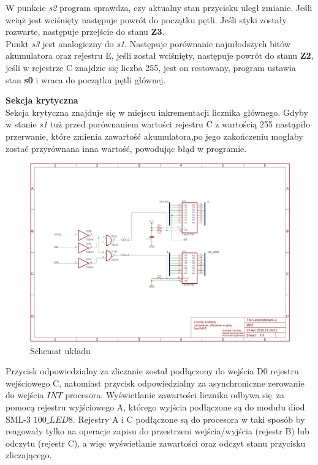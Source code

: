 \documentclass[fleqn]{article}
\begin{document}
W punkcie \textit{s2} program sprawdza, czy aktualny stan przycisku uległ zmianie. Jeśli wciąż jest wciśnięty następuje powrót do początku pętli. Jeśli styki zostały rozwarte, następuje przejście do stanu \textbf{Z3}.\\
Punkt \textit{s3} jest analogiczny do \textit{s1}. Następuje porównanie najmłodszych bitów akumulatora oraz rejestru E, jeśli został wciśnięty, następuje powrót do stanu \textbf{Z2}, jeśli w rejestrze C znajdzie się liczba 255, jest on restowany, program ustawia stan \textbf{s0} i wraca do początku pętli głównej.

\textbf{Sekcja krytyczna}
\\
Sekcja krytyczna znajduje się w miejscu inkrementacji licznika głównego. Gdyby w stanie \textit{s1} tuż przed porównaniem wartości rejestru C z wartością 255 nastąpiło przerwanie, które zmienia zawartość akumulatora,po jego zakończeniu mogłaby zostać przyrównana inna wartość, powodując błąd w programie. 
\begin{figure}[H]
	\centering
	\includegraphics[width=\textwidth]{img/schematic.pdf}
	\caption{Schemat układu}
	\label{fig:schematic}
\end{figure}


Przycisk odpowiedzialny za zliczanie został podłączony do wejścia D0 rejestru wejściowego C, natomiast przycisk odpowiedzialny za asynchroniczne zerowanie do wejścia $\overline{INT}$ procesora.
Wyświetlanie zawartości licznika odbywa się za pomocą rejestru wyjściowego A, którego wyjścia podłączone są do modułu diod SML-3 $\textit{100\_LED8}$. Rejestry A i C podłączone są do procesora w taki sposób by reagowały tylko na operacje zapisu do przestrzeni wejścia/wyjścia (rejestr B) lub odczytu (rejestr C), a więc wyświetlanie zawartości oraz odczyt stanu przycisku zliczającego.
\end{document}
